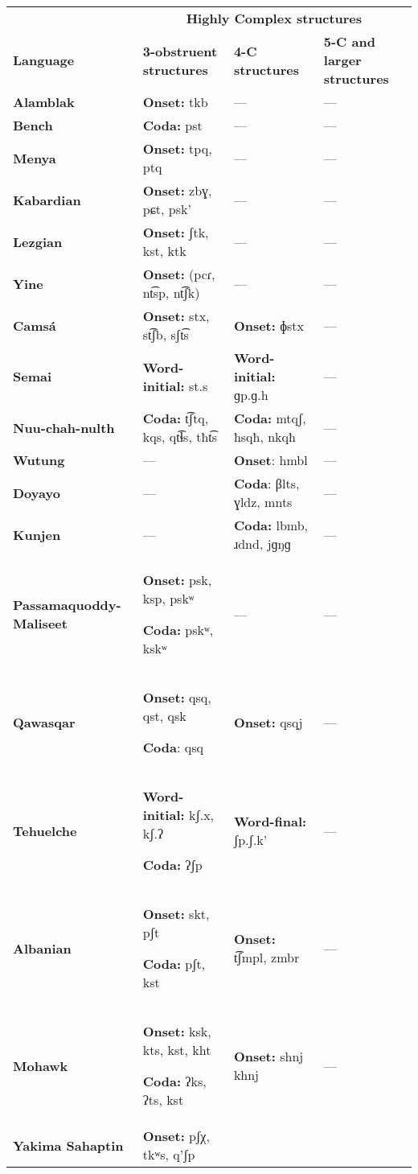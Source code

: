 \begin{table}
\begin{tabularx}{\textwidth}{XXXX}
 & \multicolumn{3}{c}{ \textbf{Highly Complex structures}}\\
\lsptoprule
\textbf{Language} & \textbf{3-obstruent structures} & \textbf{4-C structures} & \textbf{5-C and larger structures}\\
\textbf{Alamblak} & \textbf{Onset:} tkb & — & —\\
\textbf{Bench} & \textbf{Coda:} pst & — & —\\
\textbf{Menya} & \textbf{Onset:} tpq, ptq & — & —\\
\textbf{Kabardian} & \textbf{Onset:} zbɣ, pɕt, psk’ & — & —\\
\textbf{Lezgian} & \textbf{Onset:} ʃtk, kst, ktk & — & —\\
\textbf{Yine} & \textbf{Onset:} (pcɾ, nt͡sp, nt͡ʃk) & — & —\\
{\bfseries Camsá} & \textbf{Onset:} stx, st͡ʃb, sʃt͡s & { \textbf{Onset:} ɸstx} & —\\
\textbf{Semai} & \textbf{Word-initial:} st.s & \textbf{Word-initial:} ɡp.ɡ.h & —\\
\textbf{Nuu-chah-nulth} & \textbf{Coda:} t͡ʃtq, kqs, qt͡ɬs, tħt͡s & \textbf{Coda:} mtqʃ, ħsqħ, nkqħ & —\\
\textbf{Wutung} & — & \textbf{Onset}: hmbl & —\\
\textbf{Doyayo} & — & \textbf{Coda}: βlts, ɣldz, mnts & —\\
\textbf{Kunjen} & — & \textbf{Coda:} lbmb, ɹdnd, jɡŋɡ & —\\
\textbf{Passamaquoddy-Maliseet} & { \textbf{Onset:} psk, ksp, pskʷ}

{ \textbf{Coda:} pskʷ, kskʷ}  & — & —\\
\textbf{Qawasqar} & \textbf{Onset:} qsq, qst, qsk

\textbf{Coda}: qsq & \textbf{Onset:} qsqj & —\\
\textbf{Tehuelche} & \textbf{Word-initial:} kʃ.x, kʃ.ʔ

\textbf{Coda:} ʔʃp & \textbf{Word-final:} ʃp.ʃ.k’ & —\\
\textbf{Albanian} & \textbf{Onset:} skt, pʃt

\textbf{Coda:} pʃt, kst & \textbf{Onset:} t͡ʃmpl, zmbr & —\\
\textbf{Mohawk} & \textbf{Onset:} ksk, kts, kst, kht 

\textbf{Coda:} ʔks, ʔts, kst & \textbf{Onset:} shnj khnj & —\\
\textbf{Yakima Sahaptin} & \textbf{Onset:} pʃχ, tkʷs, q’ʃp


\end{tabularx}
\end{table}
